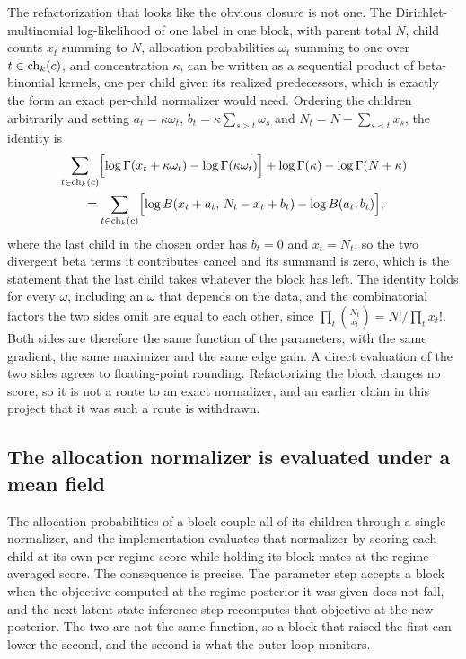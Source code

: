 The refactorization that looks like the obvious closure is not one. The
Dirichlet-multinomial log-likelihood of one label in one block, with parent total
\(N\), child counts \(x_t\) summing to \(N\), allocation probabilities
\(\omega_t\) summing to one over \(t \in \operatorname{ch}_k(c)\), and concentration
\(\kappa\), can be written as a sequential product of beta-binomial kernels, one
per child given its realized predecessors, which is exactly the form an exact
per-child normalizer would need. Ordering the children arbitrarily and setting
\(a_t = \kappa \omega_t\),
\(b_t = \kappa \sum_{s>t} \omega_s\)
and \(N_t = N - \sum_{s<t} x_s\), the identity is
\begin{align}
&\sum_{t \in \operatorname{ch}_k(c)}
\Bigl[
\log \Gamma\!\left(x_t + \kappa\omega_t\right)
- \log \Gamma\!\left(\kappa\omega_t\right)
\Bigr]
+ \log \Gamma(\kappa)
- \log \Gamma(N + \kappa)
\nonumber\\
&\qquad =
\sum_{t \in \operatorname{ch}_k(c)}
\Bigl[
\log B\!\left(x_t + a_t,\, N_t - x_t + b_t\right)
- \log B\!\left(a_t, b_t\right)
\Bigr],
\label{eq:lim_betabinomial}
\end{align}
where the last child in the chosen order has \(b_t = 0\) and \(x_t = N_t\), so
the two divergent beta terms it contributes cancel and its summand is zero, which
is the statement that the last child takes whatever the block has left. The
identity holds for every \(\omega\), including an \(\omega\) that depends on the
data, and the combinatorial factors the two sides omit are equal to each other,
since \(\prod_t \binom{N_t}{x_t} = N! / \prod_t x_t!\). Both sides are therefore
the same function of the parameters, with the same gradient, the same maximizer
and the same edge gain. A direct evaluation of the two sides agrees to
floating-point rounding. Refactorizing the block changes no
score, so it is not a route to an exact normalizer, and an earlier claim in this
project that it was such a route is withdrawn.

\subsection{The allocation normalizer is evaluated under a mean field}
\label{sec:lim_meanfield}

The allocation probabilities of a block couple all of its children through a
single normalizer, and the implementation evaluates that normalizer by scoring
each child at its own per-regime score while holding its block-mates at the
regime-averaged score. The consequence is precise. The parameter step accepts a
block when the objective computed at the regime posterior it was given does not
fall, and the next latent-state inference step recomputes that objective at the
new posterior. The two are not the same function, so a block that raised the
first can lower the second, and the second is what the outer loop monitors.

